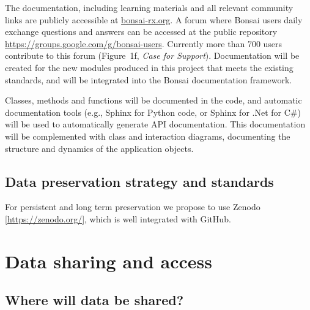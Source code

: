 \documentclass[a4paper,11pt]{article}
\renewcommand{\footnote}[1]{ [#1]}
\begin{document}

The documentation, including learning materials and all relevant community
links are publicly accessible at \url{bonsai-rx.org}. A forum where Bonsai
users daily exchange questions and answers can be accessed at the public
repository \url{https://groups.google.com/g/bonsai-users}. Currently more than
700 users contribute to this forum (Figure~1f, \emph{Case for Support}).
Documentation will be created for the new modules produced in this project that
meets the existing standards, and will be integrated into the Bonsai
documentation framework.

Classes, methods and functions will be documented in the code, and automatic
documentation tools (e.g., Sphinx for Python code, or Sphinx for .Net for C\#)
will be used to automatically generate API documentation. This documentation
will be complemented with class and interaction diagrams, documenting the
structure and dynamics of the application objects.

\subsection{Data preservation strategy and standards}


For persistent and long term preservation we propose to use
Zenodo\footnote{\url{https://zenodo.org/}}, which is well integrated with
GitHub.

\section{Data sharing and access}
\subsection{Where will data be shared?}
\end{document}
